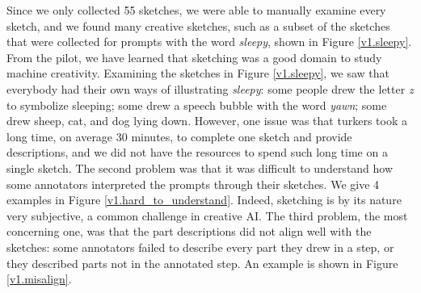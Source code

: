 Since we only collected 55 sketches, we were able to manually examine every sketch, and we found many creative sketches, such as a subset of the sketches that were collected for prompts with the word \textit{sleepy}, shown in Figure \ref{v1.sleepy}. From the pilot, we have learned that sketching was a good domain to study machine creativity. Examining the sketches in Figure \ref{v1.sleepy}, we saw that everybody had their own ways of illustrating \textit{sleepy}: some people drew the letter \textit{z} to symbolize sleeping; some drew a speech bubble with the word \textit{yawn}; some drew sheep, cat, and dog lying down.  
However, one issue was that turkers took a long time, on average 30 minutes, to complete one sketch and provide descriptions, and we did not have the resources to spend such long time on a single sketch. 
The second problem was that it was difficult to understand how some annotators interpreted the prompts through their sketches. We give 4 examples in Figure \ref{v1.hard_to_understand}.
Indeed, sketching is by its nature very subjective, a common challenge in creative AI.    
The third problem, the most concerning one, was that the part descriptions did not align well with the sketches: some annotators failed to describe every part they drew in a step, or they described parts not in the annotated step. An example is shown in Figure \ref{v1.misalign}.    





